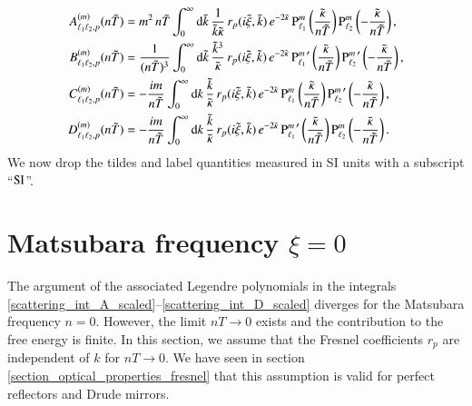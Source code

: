 \begin{align}
\label{scattering_int_A_scaled}
A_{\ell_1 \ell_2,p}^{(m)}(n\tilde{T}) &= m^2 \, n\tilde{T} \int_0^\infty \mathrm{d}\tilde{k} \, \frac{1}{\tilde{k} \tilde{\kappa}} \, r_p(i\tilde{\xi},\tilde{k}) \, e^{-2\tilde{\kappa}} \, {\text{P}_{\ell_1}^{m}}\left(\frac{\tilde{\kappa}}{n\tilde{T}}\right) {\text{P}_{\ell_2}^{m}}\left(-\frac{\tilde{\kappa}}{n\tilde{T}}\right), \\
\label{scattering_int_B_scaled}
B_{\ell_1 \ell_2,p}^{(m)}(n\tilde{T}) &= \frac{1}{(n\tilde{T})^3} \int_0^\infty \mathrm{d}\tilde{k} \, \frac{\tilde{k}^3}{\tilde{\kappa}} \, r_p(i\tilde{\xi},\tilde{k}) \, e^{-2\tilde{\kappa}} \, {\text{P}_{\ell_1}^{m}}^\prime\left(\frac{\tilde{\kappa}}{n\tilde{T}}\right) {\text{P}_{\ell_2}^{m}}^\prime\left(-\frac{\tilde{\kappa}}{n\tilde{T}}\right), \\
\label{scattering_int_C_scaled}
C_{\ell_1 \ell_2,p}^{(m)}(n\tilde{T}) &= -\frac{i m}{n\tilde{T}} \int_0^\infty \mathrm{d}k \, \frac{\tilde{k}}{\tilde{\kappa}} \, r_p(i\tilde{\xi},\tilde{k}) \, e^{-2\tilde{\kappa}} \, {\text{P}_{\ell_1}^{m}}\left(\frac{\tilde{\kappa}}{n\tilde{T}}\right) {\text{P}_{\ell_2}^{m}}^\prime\left(-\frac{\tilde{\kappa}}{n\tilde{T}}\right), \\
\label{scattering_int_D_scaled}
D_{\ell_1 \ell_2,p}^{(m)}(n\tilde{T}) &= -\frac{i m}{n\tilde{T}} \int_0^\infty \mathrm{d}k \, \frac{\tilde{k}}{\tilde{\kappa}} \, r_p(i\tilde{\xi},\tilde{k}) \, e^{-2\tilde{\kappa}} \, {\text{P}_{\ell_1}^{m}}^\prime\left(\frac{\tilde{\kappa}}{n\tilde{T}}\right) {\text{P}_{\ell_2}^{m}}\left(-\frac{\tilde{\kappa}}{n\tilde{T}}\right).
\end{align}
We now drop the tildes and label quantities measured in SI units with a subscript ``$\text{SI}$''.


\section{Matsubara frequency $\xi=0$}
\label{section_scattering_ps_xi0}

The argument of the associated Legendre polynomials in the integrals
\eqref{scattering_int_A_scaled}--\eqref{scattering_int_D_scaled} diverges for
the Matsubara frequency $n=0$. However, the limit $nT\to0$ exists and the
contribution to the free energy is finite. In this section, we assume that the
Fresnel coefficients $r_p$ are independent of $k$ for $nT \to 0$. We have seen
in section \ref{section_optical_properties_fresnel} that this assumption is
valid for perfect reflectors and Drude mirrors.

